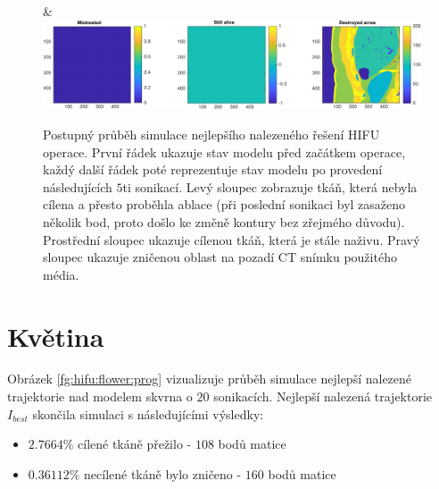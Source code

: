 \begin{figure}[H]
{\begin{tabular}{}
    &
	\includegraphics[width=\linewidth]{obrazky-figures/hifuSimProgress/blob20/blob20_20_croped.pdf}
    \end{tabular}
    }
    \caption{Postupný průběh simulace nejlepšího nalezeného řešení HIFU operace. První řádek ukazuje stav modelu před začátkem operace, každý další řádek poté reprezentuje stav modelu po provedení následujících $5$ti sonikací. Levý sloupec zobrazuje tkáň, která nebyla cílena a přesto proběhla ablace (při poslední sonikaci byl zasaženo několik bod, proto došlo ke změně kontury bez zřejmého důvodu). Prostřední sloupec ukazuje cílenou tkáň, která je stále naživu. Pravý sloupec ukazuje zničenou oblast na pozadí CT snímku použitého média.}
    \label{fg:hifu:blob:prog}
\end{figure}


\section{Květina}
Obrázek \ref{fg:hifu:flower:prog} vizualizuje průběh simulace nejlepší nalezené trajektorie nad modelem skvrna o $20$ sonikacích. Nejlepší nalezená trajektorie $I_{best}$ skončila simulaci s následujícími výsledky:
\begin{center}
\begin{itemize}
    \item $2.7664\%$ cílené tkáně přežilo - $108$ bodů matice
    \item $0.36112\%$ necílené tkáně bylo zničeno - $160$ bodů matice
\end{itemize}
\end{center}


